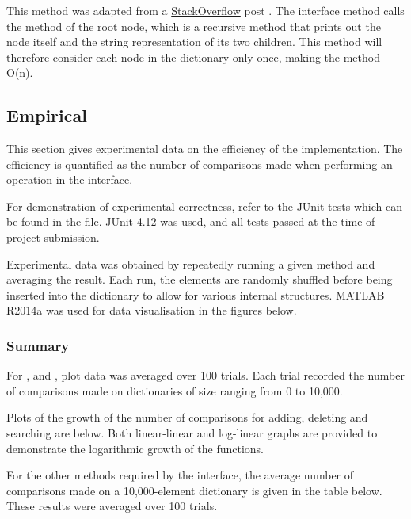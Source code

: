 \subsubsection{}
This method was adapted from a \href{http://stackoverflow.com/}{StackOverflow} post \cite{stackoverflow}. The interface method  calls the  method of the root node, which is a recursive method that prints out the node itself and the string representation of its two children. This method will therefore consider each node in the dictionary only once, making the method O(n).

\subsection{Empirical}

This section gives experimental data on the efficiency of the implementation. The efficiency is quantified as the number of comparisons made when performing an operation in the  interface.

For demonstration of experimental correctness, refer to the JUnit tests which can be found in the  file. JUnit 4.12 was used, and all tests passed at the time of project submission.

Experimental data was obtained by repeatedly running a given method and averaging the result. Each run, the elements are randomly shuffled before being inserted into the dictionary to allow for various internal structures. MATLAB R2014a was used for data visualisation in the figures below.

\subsubsection{Summary}
For ,  and , plot data was averaged over 100 trials. Each trial recorded the number of comparisons made on dictionaries of size ranging from 0 to 10,000.

Plots of the growth of the number of comparisons for adding, deleting and searching are below. Both linear-linear and log-linear graphs are provided to demonstrate the logarithmic growth of the functions.

For the other methods required by the  interface, the average number of comparisons made on a 10,000-element dictionary is given in the table below. These results were averaged over 100 trials.

